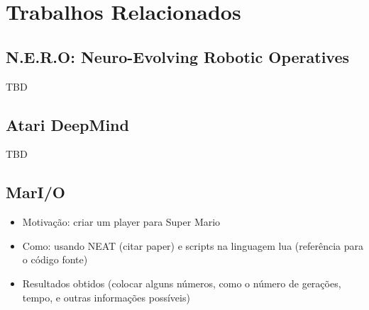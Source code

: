 \chapter{\label{chap:related-work}Trabalhos Relacionados}



\section{N.E.R.O: Neuro-Evolving Robotic Operatives}

TBD

\section{Atari DeepMind}

TBD

\section{MarI/O}

\begin{itemize}
    \item
        Motivação: criar um player para Super Mario
    \item
        Como: usando NEAT (citar paper) e scripts na linguagem lua (referência
        para o código fonte)
    \item
        Resultados obtidos (colocar alguns números, como o número de gerações,
        tempo, e outras informações possíveis)
\end{itemize}
